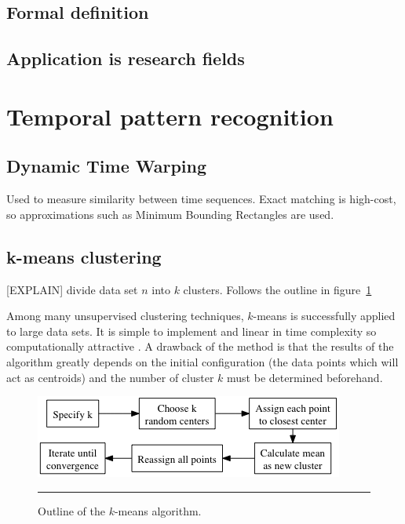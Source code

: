 
\subsection{Formal definition}






\subsection{Application is research fields}



\section{Temporal pattern recognition}

\subsection{Dynamic Time Warping}
Used to measure similarity between time sequences.
Exact matching is high-cost, so approximations such as Minimum Bounding Rectangles are used.

\subsection{k-means clustering}
[EXPLAIN] divide data set $n$ into $k$ clusters. Follows the outline in figure~\ref{fig:k_means}

Among many unsupervised clustering techniques, $k$-means is successfully applied to large data sets.
It is simple to implement and linear in time complexity so computationally attractive \cite{jain1999data}.
A drawback of the method is that the results of the algorithm greatly depends on the initial configuration (the data points which will act as centroids) and the number of cluster $k$ must be determined beforehand.

\begin{figure}[htbp]
	\centering
		\includegraphics{./Figures/k_means.png}
		\rule{35em}{0.5pt}
	\caption[K-means]{Outline of the $k$-means algorithm.}
	\label{fig:k_means}
\end{figure}


